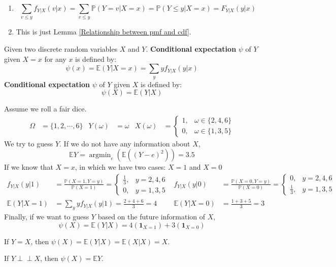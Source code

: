 \documentclass{huhtakm-template-book}
\newcommand{\independent}{\perp\!\!\!\perp}
\newcommand{\prob}{\mathbb{P}}
\newcommand{\expect}{\mathbb{E}}
\DeclareMathOperator*{\argmin}{argmin}
\begin{document}
\begin{proofing}
	\begin{enumerate}
		\item 
		\begin{equation*}
			\sum_{v\leq y}f_{Y|X}(v|x)=\sum_{v\leq y}\prob(Y=v|X=x)=\prob(Y\leq y|X=x)=F_{Y|X}(y|x)
		\end{equation*}
		\item 
		This is just Lemma \ref{Relationship between pmf and cdf}.
	\end{enumerate}
\end{proofing}
\begin{defn}
	Given two discrete random variables $X$ and $Y$. \textbf{Conditional expectation} $\psi$ of $Y$ given $X=x$ for any $x$ is defined by:
	\begin{equation*}
		\psi(x)=\expect(Y|X=x)=\sum_{y}yf_{Y|X}(y|x)
	\end{equation*}
	\textbf{Conditional expectation} $\psi$ of $Y$ given $X$ is defined by:
	\begin{equation*}
		\psi(X)=\expect(Y|X)
	\end{equation*}
\end{defn}
\begin{eg}
	Assume we roll a fair dice.
	\begin{align*}
		\Omega&=\{1,2,\cdots,6\} & Y(\omega)&=\omega & X(\omega)&=\begin{cases}
			1, &\omega\in\{2,4,6\}\\
			0, &\omega\in\{1,3,5\}
		\end{cases}
	\end{align*}
	We try to guess $Y$. If we do not have any information about $X$, 
	\begin{equation*}
		\expect Y=\argmin_{e}(\expect((Y-e)^{2}))=3.5
	\end{equation*}
	If we know that $X=x$, in which we have two cases: $X=1$ and $X=0$
	\begin{align*}
		f_{Y|X}(y|1)&=\frac{\prob(X=1,Y=y)}{\prob(X=1)}=\begin{cases}
			\frac{1}{3}, &y=2,4,6\\
			0, &y=1,3,5
		\end{cases} & f_{Y|X}(y|0)&=\frac{\prob(X=0,Y=y)}{\prob(X=0)}=\begin{cases}
			0, &y=2,4,6\\
			\frac{1}{3}, &y=1,3,5
		\end{cases}\\
		\expect(Y|X=1)&=\sum_{y}yf_{Y|X}(y|1)=\frac{2+4+6}{3}=4 & \expect(Y|X=0)&=\frac{1+3+5}{3}=3
	\end{align*}
	Finally, if we want to guess $Y$ based on the future information of $X$,
	\begin{equation*}
		\psi(X)=\expect(Y|X)=4(\mathbf{1}_{X=1})+3(\mathbf{1}_{X=0})
	\end{equation*}
\end{eg}
\begin{eg}
	If $Y=X$, then $\psi(X)=\expect(Y|X)=\expect(X|X)=X$.
\end{eg}
\begin{eg}
	If $Y\independent X$, then $\psi(X)=\expect Y$.
\end{eg}
\end{document}
